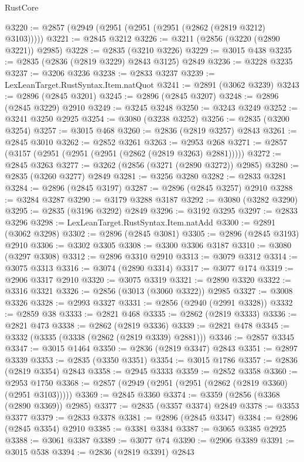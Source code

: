 \begin{lexlean}{RustCore}
\begin{coremodule}
@3220 := @2857 (@2949 (@2951 (@2951 (@2951 (@2862 (@2819 @3212) @3103)))))
@3221 := @2845 @3212
@3226 := @3211 (@2856 (@3220 (@2890 @3221)) @2985)
@3228 := @2835 (@3210 @3226)
@3229 := @3015 @438
@3235 := @2835 (@2836 (@2819 @3229) @2843 @3125) @2849
@3236 := @3228 @3235
@3237 := @3206 @3236
@3238 := @2833 @3237
@3239 := LexLeanTarget.RustSyntax.Item.natQuot
@3241 := @2891 (@3062 @3239)
@3243 := @2896 (@2845 @3201)
@3245 := @2896 (@2845 @3207)
@3248 := @2896 (@2845 @3229) @2910
@3249 := @3245 @3248
@3250 := @3243 @3249
@3252 := @3241 @3250 @2925
@3254 := @3080 (@3238 @3252)
@3256 := @2835 (@3200 @3254)
@3257 := @3015 @468
@3260 := @2836 (@2819 @3257) @2843
@3261 := @2845 @3010
@3262 := @2852 @3261
@3263 := @2953 @268
@3271 := @2857 (@3157 (@2951 (@2951 (@2951 (@2862 (@2819 @3263) @2881)))))
@3272 := @2845 @3263
@3277 := @3262 (@2856 (@3271 (@2890 @3272)) @2985)
@3280 := @2835 (@3260 @3277) @2849
@3281 := @3256 @3280
@3282 := @2833 @3281
@3284 := @2896 (@2845 @3197)
@3287 := @2896 (@2845 @3257) @2910
@3288 := @3284 @3287
@3290 := @3179 @3288 @3187
@3292 := @3080 (@3282 @3290)
@3295 := @2835 (@3196 @3292) @2849
@3296 := @3192 @3295
@3297 := @2833 @3296
@3298 := LexLeanTarget.RustSyntax.Item.natAdd
@3300 := @2891 (@3062 @3298)
@3302 := @2896 (@2845 @3081)
@3305 := @2896 (@2845 @3193) @2910
@3306 := @3302 @3305
@3308 := @3300 @3306 @3187
@3310 := @3080 (@3297 @3308)
@3312 := @2896 @3310 @2910
@3313 := @3079 @3312
@3314 := @3075 @3313
@3316 := @3074 (@2890 @3314)
@3317 := @3077 @174
@3319 := @2906 @3317 @2910
@3320 := @3075 @3319
@3321 := @2890 @3320
@3322 := @3316 @3321
@3326 := @2856 (@3013 (@3060 @3322)) @2985
@3327 := @3008 @3326
@3328 := @2993 @3327
@3331 := @2856 (@2940 (@2991 @3328))
@3332 := @2859 @38
@3333 := @2821 @468
@3335 := @2862 (@2819 @3333)
@3336 := @2821 @473
@3338 := @2862 (@2819 @3336)
@3339 := @2821 @478
@3345 := @3332 (@3335 (@3338 (@2862 (@2819 @3339) @2881)))
@3346 := @2857 @3345
@3347 := @3015 @1464
@3350 := @2836 (@2819 @3347) @2843
@3351 := @2897 @3339
@3353 := @2835 (@3350 @3351)
@3354 := @3015 @1786
@3357 := @2836 (@2819 @3354) @2843
@3358 := @2945 @3333
@3359 := @2852 @3358
@3360 := @2953 @1750
@3368 := @2857 (@2949 (@2951 (@2951 (@2862 (@2819 @3360) (@2951 @3103)))))
@3369 := @2845 @3360
@3374 := @3359 (@2856 (@3368 (@2890 @3369)) @2985)
@3377 := @2835 (@3357 @3374) @2849
@3378 := @3353 @3377
@3379 := @2833 @3378
@3381 := @2896 (@2845 @3347)
@3384 := @2896 (@2845 @3354) @2910
@3385 := @3381 @3384
@3387 := @3065 @3385 @2925
@3388 := @3061 @3387
@3389 := @3077 @74
@3390 := @2906 @3389
@3391 := @3015 @538
@3394 := @2836 (@2819 @3391) @2843

\end{coremodule}
\end{lexlean}
